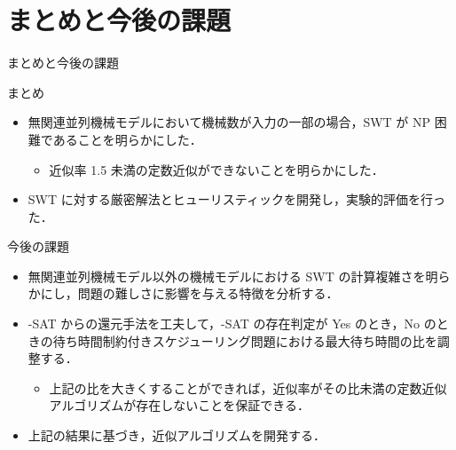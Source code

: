 \documentclass[dvipdfmx]{beamer}
\begin{document}
    \section{まとめと今後の課題}
    \begin{frame}{まとめと今後の課題}
      \begin{block}{まとめ}
        \begin{itemize}
          \item 無関連並列機械モデルにおいて機械数が入力の一部の場合，SWT が NP 困難であることを明らかにした．
          \begin{itemize}
            \item 近似率 1.5 未満の定数近似ができないことを明らかにした．
          \end{itemize}
          \item SWT に対する厳密解法とヒューリスティックを開発し，実験的評価を行った．
        \end{itemize}
      \end{block}
      \begin{alertblock}{今後の課題}
        \begin{itemize}
          \item 無関連並列機械モデル以外の機械モデルにおける SWT の計算複雑さを明らかにし，問題の難しさに影響を与える特徴を分析する．
          \item {-SAT} からの還元手法を工夫して，{-SAT} の存在判定が Yes のとき，No のときの待ち時間制約付きスケジューリング問題における最大待ち時間の比を調整する．
          \begin{itemize}
            \item 上記の比を大きくすることができれば，近似率がその比未満の定数近似アルゴリズムが存在しないことを保証できる．
          \end{itemize}
          \item 上記の結果に基づき，近似アルゴリズムを開発する．
        \end{itemize}
      \end{alertblock}
    \end{frame}
    \begin{frame}

    \end{frame}
\end{document}
